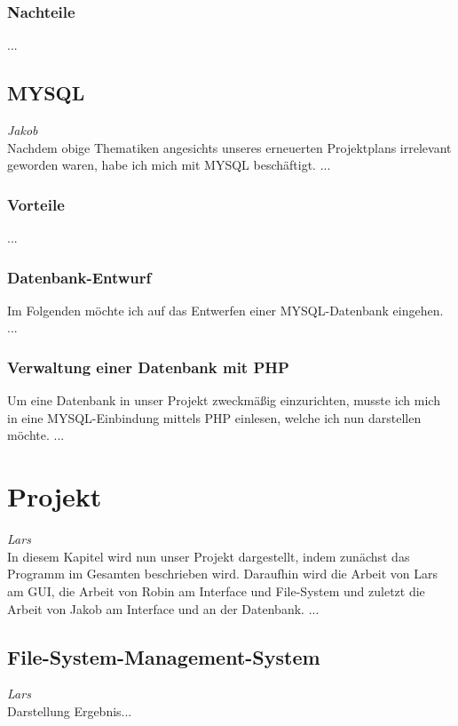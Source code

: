 \documentclass[12pt,a4paper,bibliography=totocnumbered,listof=totocnumbered]{scrartcl}
\begin{document}
\subsubsection{Nachteile}
...

\subsection{MYSQL}
\emph{Jakob}\\
Nachdem obige Thematiken angesichts unseres erneuerten Projektplans irrelevant geworden waren, habe ich mich 
mit MYSQL beschäftigt.
...

\subsubsection{Vorteile}
...

\subsubsection{Datenbank-Entwurf}
Im Folgenden möchte ich auf das Entwerfen einer MYSQL-Datenbank eingehen.
...

\subsubsection{Verwaltung einer Datenbank mit PHP}
Um eine Datenbank in unser Projekt zweckmäßig einzurichten, musste ich mich in eine MYSQL-Einbindung mittels PHP einlesen, welche ich nun darstellen möchte.
...

\pagebreak

\section{Projekt}
\emph{Lars}\\
In diesem Kapitel wird nun unser Projekt dargestellt, indem zunächst das Programm im Gesamten beschrieben wird. Daraufhin wird die Arbeit von Lars am GUI, die Arbeit von Robin am Interface und File-System und zuletzt die Arbeit von Jakob am Interface und an der Datenbank.
...

\subsection{File-System-Management-System}
\emph{Lars}\\
Darstellung Ergebnis...
\end{document}
